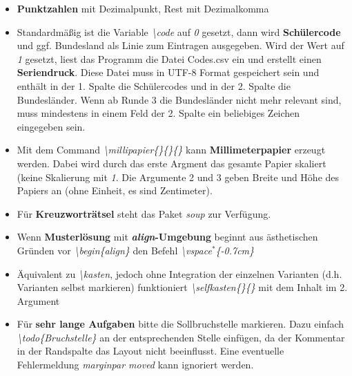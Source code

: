 \documentclass[./main.tex]{subfiles}
\begin{document}
\begin{itemize}
    \item \textbf{Punktzahlen} mit Dezimalpunkt, Rest mit Dezimalkomma
    \item Standardm\"a\ss{}ig ist die Variable \hypertarget{code}{\textit{\textbackslash code}} auf \textit{0} gesetzt, dann wird \textbf{Sch\"ulercode} und ggf. Bundesland als Linie zum Eintragen ausgegeben. Wird der Wert auf \textit{1} gesetzt, liest das Programm die Datei Codes.csv ein und erstellt einen \textbf{Seriendruck}. Diese Datei muss in UTF-8 Format gespeichert sein und enth\"alt in der 1. Spalte die Sch\"ulercodes und in der 2. Spalte die Bundesl\"ander. Wenn ab Runde 3 die Bundesl\"ander nicht mehr relevant sind, muss mindestens in einem Feld der 2. Spalte ein beliebiges Zeichen eingegeben sein.
    \item \hypertarget{millipapier}{} Mit dem Command \textit{\textbackslash millipapier\{\}\{\}\{\}} kann \textbf{Millimeterpapier} erzeugt werden. Dabei wird durch das erste Argment das gesamte Papier skaliert (keine Skalierung mit \textit{1}. Die Argumente 2 und 3 geben Breite und H\"ohe des Papiers an (ohne Einheit, es sind Zentimeter).
    \item F\"ur \textbf{Kreuzwortr\"atsel} steht das Paket \textit{soup} zur Verf\"ugung.
    \item \hypertarget{vspace}{} Wenn \textbf{Musterl\"osung} mit \textbf{\textit{align}-Umgebung} beginnt aus \"asthetischen Gr\"unden vor \textit{\textbackslash begin\{align\}} den Befehl \textit{\textbackslash vspace$^*$\{-0.7cm\}}
    \item \"Aquivalent zu \textit{\textbackslash kasten}, jedoch ohne Integration der einzelnen Varianten (d.h. Varianten selbst markieren) funktioniert \textit{\hypertarget{selfkasten}{\textbackslash selfkasten\{\}\{\}}} mit dem Inhalt im 2. Argument
    \item Für \textbf{sehr lange Aufgaben} bitte die Sollbruchstelle markieren. Dazu einfach \textit{\textbackslash{}todo\{Bruchstelle\}} an der entsprechenden Stelle einf\"ugen, da der Kommentar in der Randspalte das Layout nicht beeinflusst. Eine eventuelle Fehlermeldung \textit{marginpar moved} kann ignoriert werden.
\end{itemize}
\end{document}
